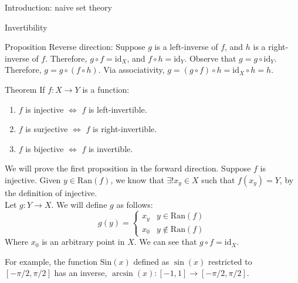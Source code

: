 \documentclass[8pt]{extarticle}
\begin{document}
{\begin{problem}{Introduction: naive set theory}
\begin{problem}{Invertibility}
\begin{problem}{Proposition}
          Reverse direction: Suppose $g$ is a left-inverse of $f$, and $h$ is a right-inverse of $f$. Therefore, $g\circ f = \textrm{id}_X$, and $f\circ h = \textrm{id}_Y$. Observe that $g = g\circ \textrm{id}_Y$. Therefore, $g = g\circ(f\circ h)$. Via associativity, $g = (g\circ f)\circ h = \textrm{id}_X \circ h = h$.
      \end{problem}
      \begin{problem}{Theorem}
        If $f:X\rightarrow Y$ is a function:
        \begin{enumerate}
          \item $f$ is injective $\Leftrightarrow$ $f$ is left-invertible.
          \item $f$ is surjective $\Leftrightarrow$ $f$ is right-invertible.
          \item $f$ is bijective $\Leftrightarrow$ $f$ is invertible.
        \end{enumerate}
        \tcblower
        We will prove the first proposition in the forward direction. Suppose $f$ is injective. Given $y\in \textrm{Ran}(f)$, we know that $\exists! x_y\in X$ such that $f(x_y) = Y$, by the definition of injective.\\

        Let $g:Y\rightarrow X$. We will define $g$ as follows:
        \[
          g(y) = \begin{cases}
            x_y & y\in \textrm{Ran}(f) \\
            x_0 & y\notin \textrm{Ran}(f)
          \end{cases}
        \] 
        Where $x_0$ is an arbitrary point in $X$. We can see that $g\circ f = \textrm{id}_X$.
      \end{problem}
      For example, the function $\textrm{Sin}(x)$ defined as $\sin(x)$ restricted to $[-\pi/2,\pi/2]$ has an inverse, $\arcsin(x):[-1,1] \rightarrow [-\pi/2,\pi/2]$.
    \end{problem}
  \end{problem}
}
\end{document}
